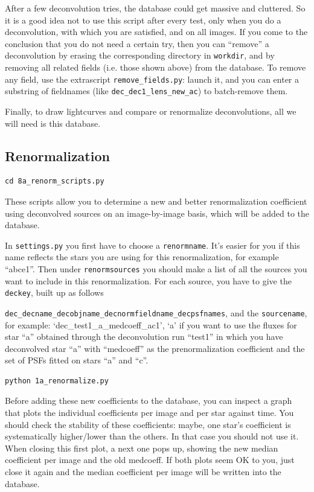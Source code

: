 After a few deconvolution tries, the database could get massive and cluttered. So it is a good idea not to use this script after every test, only when you do a deconvolution, with which you are satisfied, and on all images. If you come to the conclusion that you do not need a certain try, then you can ``remove'' a deconvolution by erasing the corresponding directory in \verb+workdir+, and by removing all related fields (i.e. those shown above) from the database. To remove any field, use the extrascript \verb+remove_fields.py+: launch it, and you can enter a substring of fieldnames (like \verb+dec_dec1_lens_new_ac+) to batch-remove them.

Finally, to draw lightcurves and compare or renormalize deconvolutions, all we will need is this database.  


\subsection{Renormalization}

\begin{Verbatim}
cd 8a_renorm_scripts.py
\end{Verbatim}

These scripts allow you to determine a new and better renormalization coefficient using deconvolved sources on an image-by-image basis, which will be added to the database.

In \verb+settings.py+ you first have to choose a \verb+renormname+. It's easier for you if this name reflects the stars you are using for this renormalization, for example ``abce1''. Then under \verb+renormsources+ you should make a list of all the sources you want to include in this renormalization. For each source, you have to give the \verb+deckey+, built up as follows 

\verb+dec_decname_decobjname_decnormfieldname_decpsfnames+, and the \verb+sourcename+, for example: `dec\_test1\_a\_medcoeff\_ac1', `a' if you want to use the fluxes for star ``a'' obtained through the deconvolution run ``test1'' in which you have deconvolved star ``a'' with ``medcoeff'' as the prenormalization coefficient and the set of PSFs fitted on stars ``a'' and ``c''.

\begin{Verbatim}
python 1a_renormalize.py
\end{Verbatim}
Before adding these new coefficients to the database, you can inspect a graph that plots the individual coefficients per image and per star against time. You should check the stability of these coefficients: maybe, one star's coefficient is systematically higher/lower than the others. In that case you should not use it. When closing this first plot, a next one pops up, showing the new median coefficient per image and the old medcoeff. If both plots seem OK to you, just close it again and the median coefficient per image will be written into the database. 

